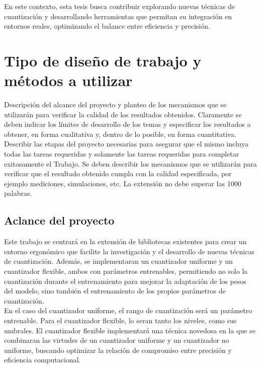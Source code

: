 \documentclass[a4paper,11pt, oneside]{article}
\begin{document}
En este contexto, esta tesis busca contribuir explorando nuevas técnicas de cuantización y desarrollando herramientas que permitan su integración en entornos reales, optimizando el balance entre eficiencia y precisión. \\

\section*{Tipo de diseño de trabajo y métodos a utilizar}

    {
        \color{gray}
        \scriptsize
        Descripción del alcance del proyecto y planteo de los mecanismos que se utilizarán para verificar la calidad de los resultados obtenidos. Claramente se deben indicar los límites de desarrollo de los temas y especificar los resultados a obtener, en forma cualitativa y, dentro de lo posible, en forma cuantitativa. Describir las etapas del proyecto necesarias para asegurar que el mismo incluya todas las tareas requeridas y solamente las tareas requeridas para completar exitosamente el Trabajo. Se deben describir los mecanismos que se utilizarán para verificar que el resultado obtenido cumpla con la calidad especificada, por ejemplo mediciones, simulaciones, etc. La extensión no debe superar las 1000 palabras.\\
    }

\subsection*{Aclance del proyecto}

Este trabajo se centrará en la extensión de bibliotecas existentes para crear un entorno ergonómico que facilite la investigación y el desarrollo de nuevas técnicas de cuantización. Además, se implementaran un cuantizador uniforme y un cuantizador flexible, ambos con parámetros entrenables, permitiendo no solo la cuantización durante el entrenamiento para mejorar la adaptación de los pesos del modelo, sino también el entrenamiento de los propios parámetros de cuantización. \\

En el caso del cuantizador uniforme, el rango de cuantización será un parámetro entrenable. Para el cuantizador flexible, lo seran tanto los niveles, como sus umbrales. El cuantizador flexible implementará una técnica novedosa en la que se combinaran las virtudes de un cuantizador uniforme y un cuantizador no uniforme, buscando optimizar la relación de compromiso entre precisión y eficiencia computacional. \\
\end{document}
